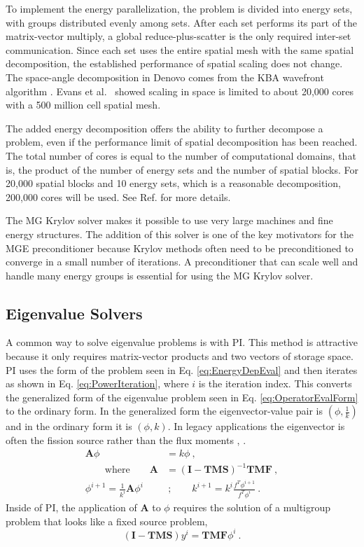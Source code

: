 \documentclass[preprint,12pt]{elsarticle}
\newcommand{\ve}[1]{\ensuremath{\mathbf{#1}}}
\begin{document}
To implement the energy parallelization, the problem is divided into energy sets, with groups distributed evenly among sets. After each set performs its part of the matrix-vector multiply, a global reduce-plus-scatter is the only required inter-set communication. Since each set uses the entire spatial mesh with the same spatial decomposition, the established performance of spatial scaling does not change. The space-angle decomposition in Denovo comes from the KBA wavefront algorithm \cite{Baker1998}. Evans et al.\ \cite{Evans2009d} showed scaling in space is limited to about 20,000 cores with a 500 million cell spatial mesh. 

The added energy decomposition offers the ability to further decompose a problem, even if the performance limit of spatial decomposition has been reached. The total number of cores is equal to the number of computational domains, that is, the product of the number of energy sets and the number of spatial blocks. For 20,000 spatial blocks and 10 energy sets, which is a reasonable decomposition, 200,000 cores will be used. See Ref. \cite{Evans2011} for more details. 

The MG Krylov solver makes it possible to use very large machines and fine energy structures. The addition of this solver is one of the key motivators for the MGE preconditioner because Krylov methods often need to be preconditioned to converge in a small number of iterations. A preconditioner that can scale well and handle many energy groups is essential for using the MG Krylov solver. 

\subsection{Eigenvalue Solvers}
\label{sec:eigenvalue}
A common way to solve eigenvalue problems is with PI. This method is attractive because it only requires matrix-vector products and two vectors of storage space. PI uses the form of the problem seen in Eq. \eqref{eq:EnergyDepEval} and then iterates as shown in Eq. \eqref{eq:PowerIteration}, where $i$ is the iteration index. This converts the generalized form of the eigenvalue problem seen in Eq. \eqref{eq:OperatorEvalForm} to the ordinary form. In the generalized form the eigenvector-value pair is $(\phi, \frac{1}{k})$ and in the ordinary form it is $(\phi, k)$. In legacy applications the eigenvector is often the fission source rather than the flux moments \cite{Evans2011}, \cite{Lewis1993}.
\begin{align}
  \ve{A}\phi &= k\phi \:, \label{eq:EnergyDepEval} \\
  \qquad \text{where}  \qquad \ve{A} &= (\ve{I} - \ve{TMS})^{-1} \ve{TMF} \:, \nonumber \\
  \phi^{i+1} = \frac{1}{k^i}\ve{A}\phi^{i} &\:; \qquad 
  k^{i+1} = k^i \frac{f^T \phi^{i+1}}{f^T \phi^i} \:.
  \label{eq:PowerIteration}
\end{align} 
%
Inside of PI, the application of $\ve{A}$ to $\phi$ requires the solution of a multigroup problem that looks like a fixed source problem,
\begin{equation}
  (\ve{I} - \ve{TMS})y^{i} = \ve{TMF}\phi^{i} \:. \label{eq:EvalDepFxdSource}
\end{equation}
\end{document}
